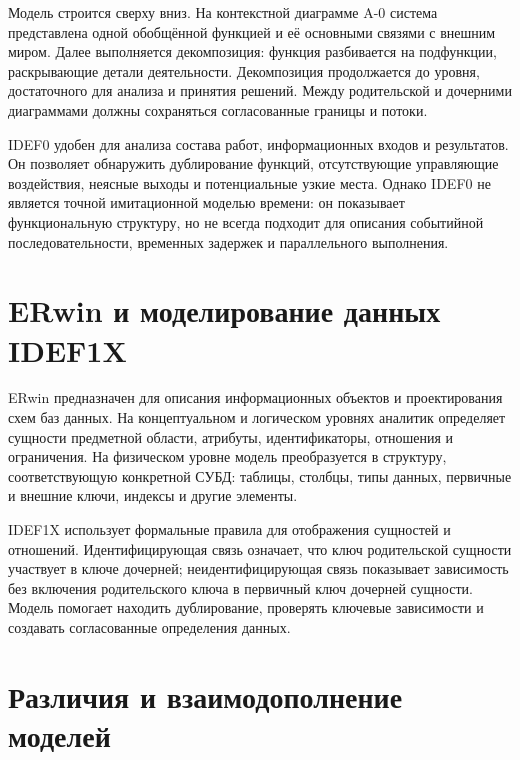 \documentclass[essaypaper,paper]{pmk-graduate}
\begin{document}
\par

Модель строится сверху вниз. На контекстной диаграмме A-0 система представлена одной обобщённой функцией и её основными связями с внешним миром. Далее выполняется декомпозиция: функция разбивается на подфункции, раскрывающие детали деятельности. Декомпозиция продолжается до уровня, достаточного для анализа и принятия решений. Между родительской и дочерними диаграммами должны сохраняться согласованные границы и потоки.

\par

IDEF0 удобен для анализа состава работ, информационных входов и результатов. Он позволяет обнаружить дублирование функций, отсутствующие управляющие воздействия, неясные выходы и потенциальные узкие места. Однако IDEF0 не является точной имитационной моделью времени: он показывает функциональную структуру, но не всегда подходит для описания событийной последовательности, временных задержек и параллельного выполнения.

\par

\section{ERwin и моделирование данных IDEF1X}

ERwin предназначен для описания информационных объектов и проектирования схем баз данных. На концептуальном и логическом уровнях аналитик определяет сущности предметной области, атрибуты, идентификаторы, отношения и ограничения. На физическом уровне модель преобразуется в структуру, соответствующую конкретной СУБД: таблицы, столбцы, типы данных, первичные и внешние ключи, индексы и другие элементы.

\par

IDEF1X использует формальные правила для отображения сущностей и отношений. Идентифицирующая связь означает, что ключ родительской сущности участвует в ключе дочерней; неидентифицирующая связь показывает зависимость без включения родительского ключа в первичный ключ дочерней сущности. Модель помогает находить дублирование, проверять ключевые зависимости и создавать согласованные определения данных.

\par

\section{Различия и взаимодополнение моделей}
\end{document}

